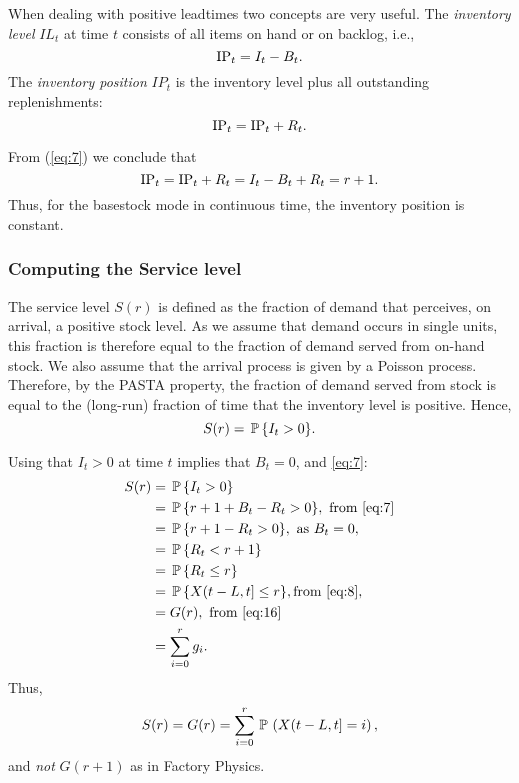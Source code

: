 When dealing with positive leadtimes two concepts are very useful. The \emph{inventory level} $IL_t$ at time $t$ consists of all items on hand or on backlog, i.e.,
\begin{equation}\label{eq:23}
  \IL_t = I_t - B_t.
\end{equation}
The \emph{inventory position} $IP_t$ is the inventory level plus all outstanding replenishments:
\begin{equation*}
  \IP_t = \IL_t + R_t.
\end{equation*}

From (\ref{eq:7}) we conclude that 
\begin{equation}\label{eq:20}
\IP_t =\IL_t + R_t = I_t - B_t +R_t = r+1.
\end{equation}
Thus, for the basestock mode in continuous time, the inventory position is constant. 




\subsubsection{Computing the Service level}

The service level $S(r)$ is defined as the fraction of demand that
perceives, on arrival, a positive stock level. As we assume that demand
occurs in single units, this fraction is therefore equal to the fraction
of demand served from on-hand stock. We also assume that the arrival
process is given by a Poisson process. Therefore, by the PASTA property,
the fraction of demand served from stock is equal to the (long-run)
fraction of time that the inventory level is positive. Hence,
\begin{equation*}
   S(r) = \P\{I_t >0\}.
\end{equation*}

Using that $I_t>0$ at time $t$ implies that $B_t = 0$,
and \ref{eq:7}:
\begin{equation}\label{eq:10}
  \begin{split}
   S(r) &= \P\{I_t >0\} \\
   &= \P\{r+1 + B_t - R_t >0\}, \text{  from  \ref{eq:7}}  \\
   &= \P\{r+1 - R_t >0\}, \text{ as } B_t = 0, \\
   &= \P\{R_t < r+1\} \\
   &= \P\{R_t \leq r\} \\
   & = \P\{X(t-L,t] \leq  r\}, \text{from  \ref{eq:8}}, \\
   &= G(r),  \text{ from \ref{eq:16}} \\
   &=  \sum_{i=0}^{r} g_i.
  \end{split}
\end{equation}
Thus,
\begin{equation}
  \label{eq:13}
   S(r) = G(r) = \sum_{i=0}^r \PP{X(t-L,t] = i},
\end{equation}
and \emph{not} $G(r+1)$ as in Factory Physics.

